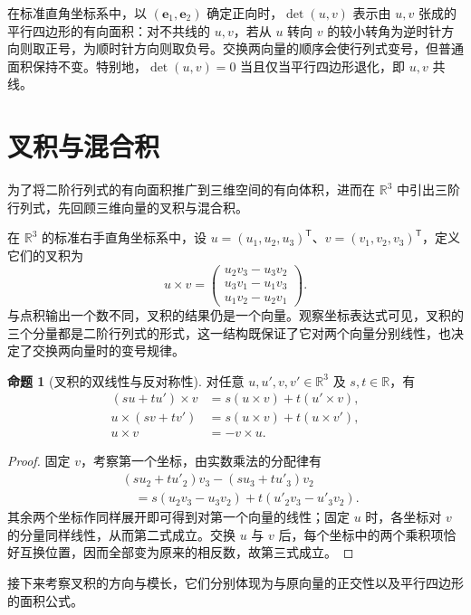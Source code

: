 \documentclass[UTF8, fontset=fandol, a4paper, 12pt]{ctexart}
\newcommand{\R}{\mathbb{R}}
\theoremstyle{definition}
\newtheorem{proposition}[definition]{命题}
\begin{document}
在标准直角坐标系中，以 $(\boldsymbol e_1,\boldsymbol e_2)$ 确定正向时，$\det(u,v)$ 表示由 $u,v$ 张成的平行四边形的有向面积：对不共线的 $u,v$，若从 $u$ 转向 $v$ 的较小转角为逆时针方向则取正号，为顺时针方向则取负号。交换两向量的顺序会使行列式变号，但普通面积保持不变。特别地，$\det(u,v)=0$ 当且仅当平行四边形退化，即 $u,v$ 共线。

\section{叉积与混合积}

为了将二阶行列式的有向面积推广到三维空间的有向体积，进而在 $\R^3$ 中引出三阶行列式，先回顾三维向量的叉积与混合积。

在 $\R^3$ 的标准右手直角坐标系中，设 $u=(u_1,u_2,u_3)^{\mathsf T}$、$v=(v_1,v_2,v_3)^{\mathsf T}$，定义它们的叉积为
\[
u\times v=
\begin{pmatrix}
u_2v_3-u_3v_2\\u_3v_1-u_1v_3\\u_1v_2-u_2v_1
\end{pmatrix}.
\]
与点积输出一个数不同，叉积的结果仍是一个向量。观察坐标表达式可见，叉积的三个分量都是二阶行列式的形式，这一结构既保证了它对两个向量分别线性，也决定了交换两向量时的变号规律。

\begin{proposition}[叉积的双线性与反对称性]
对任意 $u,u',v,v'\in\R^3$ 及 $s,t\in\R$，有
\begin{align*}
(su+tu')\times v&=s(u\times v)+t(u'\times v),\\
u\times(sv+tv')&=s(u\times v)+t(u\times v'),\\
u\times v&=-v\times u.
\end{align*}
\end{proposition}
\begin{proof}
固定 $v$，考察第一个坐标，由实数乘法的分配律有
\begin{align*}
 &(su_2+tu'_2)v_3-(su_3+tu'_3)v_2\\
 &\quad=s(u_2v_3-u_3v_2)+t(u'_2v_3-u'_3v_2).
\end{align*}
其余两个坐标作同样展开即可得到对第一个向量的线性；固定 $u$ 时，各坐标对 $v$ 的分量同样线性，从而第二式成立。交换 $u$ 与 $v$ 后，每个坐标中的两个乘积项恰好互换位置，因而全部变为原来的相反数，故第三式成立。
\end{proof}

接下来考察叉积的方向与模长，它们分别体现为与原向量的正交性以及平行四边形的面积公式。
\end{document}
